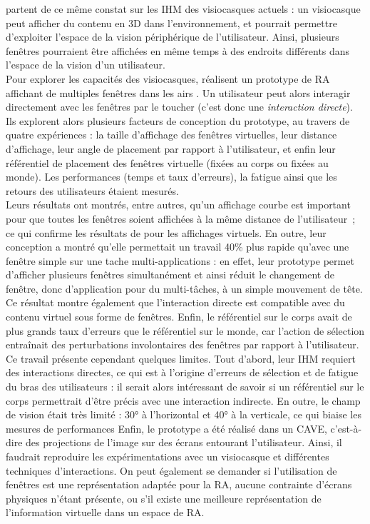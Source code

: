 \citet{Ens2014} partent de ce même constat sur les IHM des visiocasques actuels : un visiocasque peut afficher du contenu en 3D dans l'environnement, et pourrait permettre d'exploiter l'espace de la vision périphérique de l'utilisateur. Ainsi, plusieurs fenêtres pourraient être affichées en même temps à des endroits différents dans l'espace de la vision d'un utilisateur.\\
Pour explorer les capacités des visiocasques, \citeauthor{Ens2014} réalisent un prototype de RA affichant de multiples fenêtres dans les airs . Un utilisateur peut alors interagir directement avec les fenêtres par le toucher (c'est donc une \emph{interaction directe}). Ils explorent alors plusieurs facteurs de conception du prototype, au travers de quatre expériences : la taille d'affichage des fenêtres virtuelles, leur distance d'affichage, leur angle de placement par rapport à l'utilisateur, et enfin leur référentiel de placement des fenêtres virtuelle (fixées au corps ou fixées au monde). Les performances (temps et taux d'erreurs), la fatigue ainsi que les retours des utilisateurs étaient mesurés.\\ 
Leurs résultats ont montrés, entre autres, qu'un affichage courbe est important pour que toutes les fenêtres soient affichées à la même distance de l'utilisateur~; ce qui confirme les résultats de \citet{ShuppBallYostEtAl2006} pour les affichages virtuels. En outre, leur conception a montré qu'elle permettait un travail 40\% plus rapide qu'avec une fenêtre simple sur une tache multi-applications : en effet, leur prototype permet d'afficher plusieurs fenêtres simultanément et ainsi réduit le changement de fenêtre, donc d'application pour du multi-tâches, à un simple mouvement de tête. Ce résultat montre également que l'interaction directe est compatible avec du contenu virtuel sous forme de fenêtres. Enfin, le référentiel sur le corps avait de plus grands taux d'erreurs que le référentiel sur le monde, car l'action de sélection entraînait des perturbations involontaires des fenêtres par rapport à l'utilisateur.\\ 
Ce travail présente cependant quelques limites. Tout d'abord, leur IHM requiert des interactions directes, ce qui est à l'origine d'erreurs de sélection et de fatigue du bras des utilisateurs : il serait alors intéressant de savoir si un référentiel sur le corps permettrait d'être précis avec une interaction indirecte. En outre, le champ de vision était très limité : 30° à l'horizontal et 40° à la verticale, ce qui biaise les mesures de performances Enfin, le prototype a été réalisé dans un CAVE, c'est-à-dire des projections de l'image sur des écrans entourant l'utilisateur. Ainsi, il faudrait reproduire les expérimentations avec un visiocasque et différentes techniques d'interactions. On peut également se demander si l'utilisation de fenêtres est une représentation adaptée pour la RA, aucune contrainte d'écrans physiques n'étant présente, ou s'il existe une meilleure représentation de l'information virtuelle dans un espace de RA.

